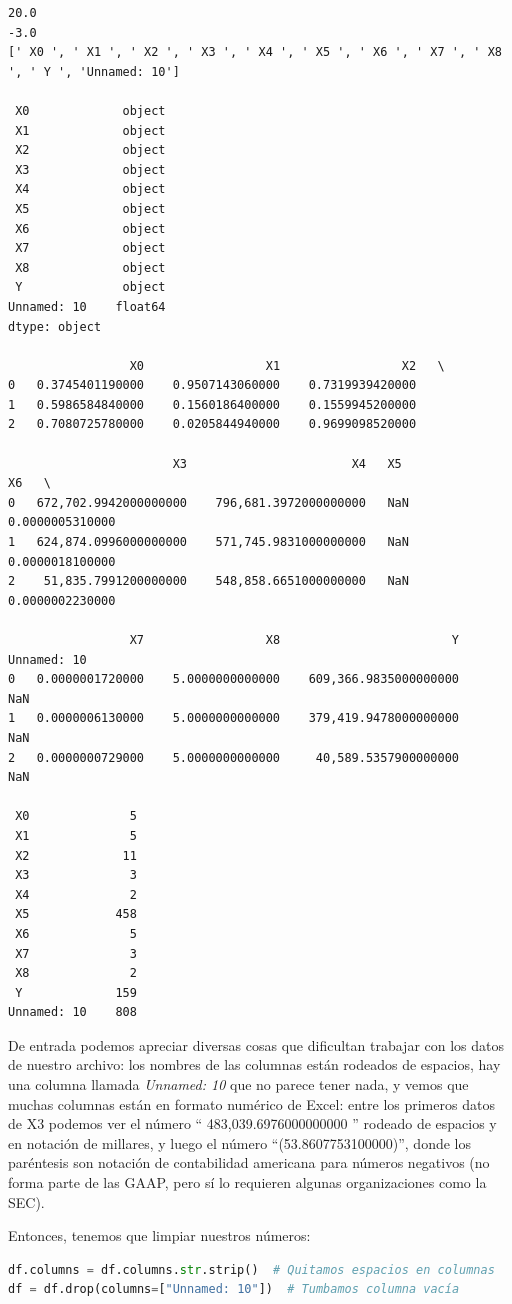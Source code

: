 \documentclass[spanish,oneside]{book} %
\begin{document}
\begin{lstlisting}
20.0
-3.0
[' X0 ', ' X1 ', ' X2 ', ' X3 ', ' X4 ', ' X5 ', ' X6 ', ' X7 ', ' X8 ', ' Y ', 'Unnamed: 10']

 X0             object
 X1             object
 X2             object
 X3             object
 X4             object
 X5             object
 X6             object
 X7             object
 X8             object
 Y              object
Unnamed: 10    float64
dtype: object

                 X0                 X1                 X2   \
0   0.3745401190000    0.9507143060000    0.7319939420000    
1   0.5986584840000    0.1560186400000    0.1559945200000    
2   0.7080725780000    0.0205844940000    0.9699098520000    

                       X3                       X4   X5                 X6   \
0   672,702.9942000000000    796,681.3972000000000   NaN   0.0000005310000    
1   624,874.0996000000000    571,745.9831000000000   NaN   0.0000018100000    
2    51,835.7991200000000    548,858.6651000000000   NaN   0.0000002230000    

                 X7                 X8                        Y   Unnamed: 10  
0   0.0000001720000    5.0000000000000    609,366.9835000000000           NaN  
1   0.0000006130000    5.0000000000000    379,419.9478000000000           NaN  
2   0.0000000729000    5.0000000000000     40,589.5357900000000           NaN  

 X0              5
 X1              5
 X2             11
 X3              3
 X4              2
 X5            458
 X6              5
 X7              3
 X8              2
 Y             159
Unnamed: 10    808
\end{lstlisting}

De entrada podemos apreciar diversas cosas que dificultan trabajar con los datos de nuestro archivo: los nombres de las columnas están rodeados de espacios, hay una columna llamada \textit{Unnamed: 10} que no parece tener nada, y vemos que muchas columnas están en formato numérico de Excel: entre los primeros datos de X3 podemos ver el número `` 483,039.6976000000000 '' rodeado de espacios y en notación de millares, y luego el número ``(53.8607753100000)'', donde los paréntesis son notación de contabilidad americana para números negativos (no forma parte de las GAAP, pero sí lo requieren algunas organizaciones como la SEC).

Entonces, tenemos que limpiar nuestros números:

\begin{lstlisting}[language=Python]
df.columns = df.columns.str.strip()  # Quitamos espacios en columnas
df = df.drop(columns=["Unnamed: 10"])  # Tumbamos columna vacía
\end{lstlisting}
\end{document}
